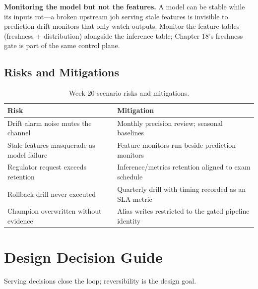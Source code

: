 \begin{pitfall}
\textbf{Monitoring the model but not the features.} A model can be stable while its inputs rot---a broken upstream job serving stale features is invisible to prediction-drift monitors that only watch outputs. Monitor the feature tables (freshness + distribution) alongside the inference table; Chapter 18's freshness gate is part of the same control plane.
\end{pitfall}

\subsection{Risks and Mitigations}
\begin{table}[H]
\centering
\small
\begin{tabular}{@{}p{4.6cm}p{7.6cm}@{}}
\toprule
\textbf{Risk} & \textbf{Mitigation} \\
\midrule
Drift alarm noise mutes the channel & Monthly precision review; seasonal baselines \\
Stale features masquerade as model failure & Feature monitors run beside prediction monitors \\
Regulator request exceeds retention & Inference/metrics retention aligned to exam schedule \\
Rollback drill never executed & Quarterly drill with timing recorded as an SLA metric \\
Champion overwritten without evidence & Alias writes restricted to the gated pipeline identity \\
\bottomrule
\end{tabular}
\caption{Week 20 scenario risks and mitigations.}
\label{tab:ch20-risks}
\end{table}

\section{Design Decision Guide}
%
Serving decisions close the loop; reversibility is the design goal.

